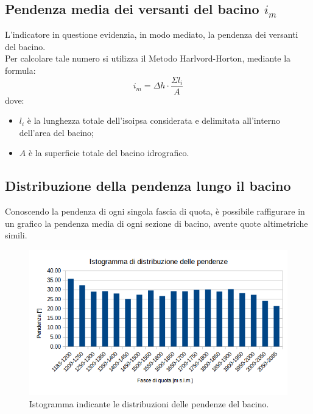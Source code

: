 \subsection{Pendenza media dei versanti del bacino $i_m$}
L'indicatore in questione evidenzia, in modo mediato, la pendenza dei versanti del bacino.\\
Per calcolare tale numero si utilizza il Metodo Harlvord-Horton, mediante la formula:
\begin{equation}
    i_m = \Delta h \cdot \frac{\Sigma l_i}{A}
\end{equation}
dove: 
\begin{itemize}
 \item $l_i$ è la lunghezza totale dell'isoipsa considerata e delimitata all'interno dell'area del bacino;
 \item $A$ è la superficie totale del bacino idrografico.
\end{itemize}

\subsection{Distribuzione della pendenza lungo il bacino}
Conoscendo la pendenza di ogni singola fascia di quota, è possibile raffigurare in un grafico la pendenza media di ogni sezione di bacino, avente quote altimetriche simili.
\begin{figure}[H] \centering
\includegraphics[scale=0.8]{immagini/istogramma_distribuzione_pendenze.png}
    \caption{Istogramma indicante le distribuzioni delle pendenze del bacino.}
\end{figure}

